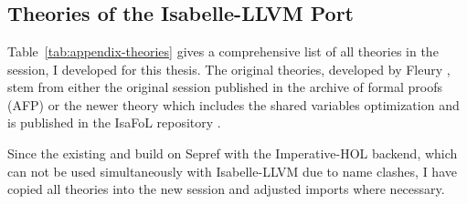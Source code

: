 \section*{}\label{sec:appendix}

\subsection*{Theories of the Isabelle-LLVM Port}\label{sec:appendix-theories}

Table~\ref{tab:appendix-theories} gives a comprehensive list of all theories in the  session, I developed for this thesis.
The original theories, developed by Fleury \cite{pasteque}, stem from either the original  session published in the archive of formal proofs (AFP) \cite{PAC_Checker-AFP} or the newer  theory which includes the shared variables optimization and is published in the IsaFoL repository \cite{isafol}.

Since the existing  and  build on Sepref with the Imperative-HOL backend, which can not be used simultaneously with Isabelle-LLVM due to name clashes, I have copied all theories into the new  session and adjusted imports where necessary.

